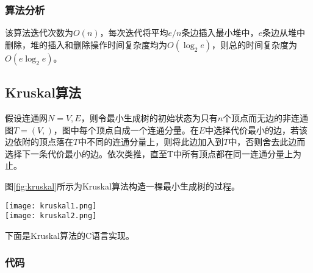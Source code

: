 \subsubsection{算法分析}
该算法迭代次数为$O(n)$，每次迭代将平均$e/n$条边插入最小堆中，$e$条边从堆中删除，堆的插入和删除操作时间复杂度均为$O(\log_2 e)$，则总的时间复杂度为 $O(e\log_2e)$。

\subsection{Kruskal算法}
假设连通网$N={V, E}$，则令最小生成树的初始状态为只有$n$个顶点而无边的非连通图$T=(V, {})$，图中每个顶点自成一个连通分量。在$E$中选择代价最小的边，若该边依附的顶点落在$T$中不同的连通分量上，则将此边加入到$T$中，否则舍去此边而选择下一条代价最小的边。依次类推，直至T中所有顶点都在同一连通分量上为止。

图\ref{fig:kruskal}所示为Kruskal算法构造一棵最小生成树的过程。

\begin{center}
\texttt{[image: kruskal1.png]}\\
\texttt{[image: kruskal2.png]}\\
\label{fig:kruskal}
\end{center}

下面是Kruskal算法的C语言实现。

\subsubsection{代码}


